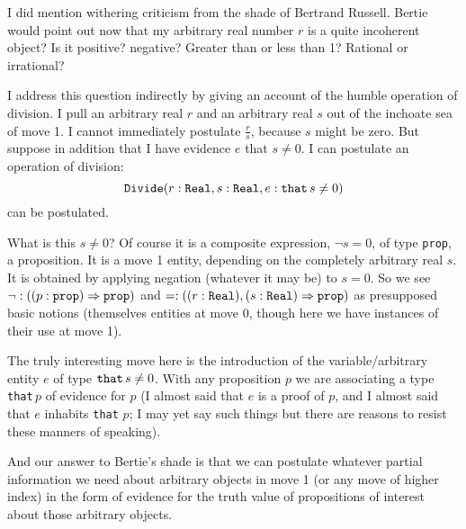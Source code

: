 \documentclass{slides}
\begin{document}
\begin{slide}

I did mention withering criticism from the shade of Bertrand Russell.  Bertie would point out now that  my arbitrary real number $r$ is a quite incoherent object?  Is it positive?  negative?
Greater than or less than 1?  Rational or irrational?

I address this question indirectly by giving an account of the humble operation of division.  I pull an arbitrary real $r$ and an arbitrary real $s$ out of the inchoate sea of move 1.  I cannot immediately postulate $\frac rs$, because $s$ might be zero.  But suppose in addition that I have evidence $e$ that $s \neq 0$.  I can postulate an operation of division:  $${\tt Divide}(r:{\tt Real},s:{\tt Real},e:{\tt that}\, s \neq 0)$$ can be postulated.

\end{slide}

\begin{slide}

What is this $s \neq 0$?  Of course it is a composite expression, $\neg s=0$, of type {\tt prop}, a proposition.  It is a move 1 entity, depending on the completely arbitrary real $s$.
It is obtained by applying negation (whatever it may be) to $s=0$.  So we see $\neg:((p:{\tt prop}) \Rightarrow {\tt prop})$ and $=:((r:{\tt Real}),(s:{\tt Real}) \Rightarrow {\tt prop})$ as presupposed basic notions (themselves entities at move 0, though here we have instances of their use at move 1).

The truly interesting move here is the introduction of the variable/arbitrary entity $e$ of type ${\tt that} \, s \neq 0$.  With any proposition $p$ we are associating a type
{\tt that}\,$ p$ of evidence for $p$ (I almost said that $e$ is a proof of $p$, and I almost said that $e$ inhabits {\tt that} $p$;  I may yet say such things but there are reasons to resist these manners of speaking).

\end{slide}

And our answer to Bertie's shade is that we can postulate whatever partial information we need about arbitrary objects in move 1 (or any move of higher index) in the form of evidence for
the truth value of propositions of interest about those arbitrary objects.

\begin{slide}

\end{slide}
\end{document}
